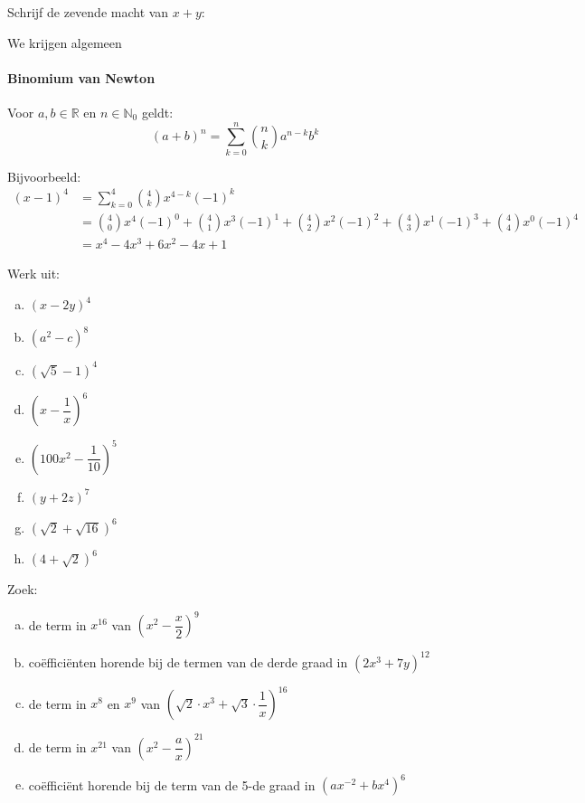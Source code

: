 \documentclass[12pt,twoside]{article}
\begin{document}
\begin{theorie}
Schrijf de zevende macht van $x+y$:

We krijgen algemeen
\paragraph{Binomium van Newton}
\begin{mdframed}
Voor $a,b\in\mathbb{R}$ en $n\in\mathbb{N}_0$ geldt:
$$(a+b)^n=\sum^n_{k=0}{n \choose k}a^{n-k}b^k$$
\end{mdframed}

Bijvoorbeeld:
\begin{align*}\displaystyle
  (x-1)^4 &= \sum^4_{k=0}{4 \choose k}x^{4-k}(-1)^k\\
          &= {4 \choose 0}x^4(-1)^0 + {4 \choose 1}x^3(-1)^1+{4 \choose 2}x^2(-1)^2+{4 \choose 3}x^1(-1)^3+{4 \choose 4}x^0(-1)^4\\
          &=x^4-4x^3+6x^2-4x+1
\end{align*}

\end{theorie}

\begin{oefening}
Werk uit:
\begin{multicols}{3}
\begin{enumerate}[(a)]
  \item $\left(x-2y\right)^4$
  \item $\left(a^2-c\right)^8$
  \item $\left(\sqrt{5}-1\right)^4$
  \item $\left(x-\dfrac{1}{x}\right)^6$
  \item $\left(100x^2-\dfrac{1}{10}\right)^5$
  \item $\left(y+2z\right)^7$
  \item $\left(\sqrt{2}+\sqrt{16}\right)^6$
  \item $\left(4+\sqrt{2}\right)^6$
\end{enumerate}
\end{multicols}
\end{oefening}

\begin{oefening}
Zoek:
\begin{enumerate}[(a)]
  \itemsep.5em
  \item de term in $x^{16}$ van $\left(x^2-\dfrac{x}{2}\right)^9$
  \item coëfficiënten horende bij de termen van de derde graad in $\left(2x^3+7y\right)^{12}$
  \item de term in $x^{8}$ en $x^9$ van $\left(\sqrt{2}\cdot x^3+\sqrt{3}\cdot \dfrac{1}{x}\right)^{16}$
  \item de term in $x^{21}$ van $\left(x^2-\dfrac{a}{x}\right)^{21}$
  \item coëfficiënt horende bij de term van de 5-de graad in $\left(ax^{-2}+bx^4\right)^{6}$
\end{enumerate}
\end{oefening}
\end{document}
